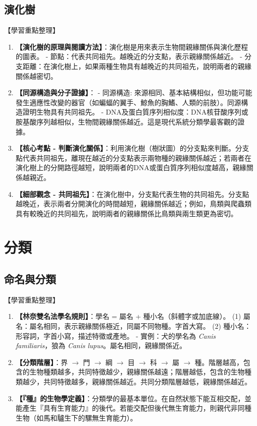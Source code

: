 \documentclass[11pt,a4paper]{article}
\begin{document}
\subsection{演化樹}
\begin{learningpoints}{【學習重點整理】}
\begin{enumerate}[label=\arabic*.]
  \item \textbf{【演化樹的原理與閱讀方法】}：演化樹是用來表示生物間親緣關係與演化歷程的圖表。
  - 節點：代表共同祖先。越晚近的分支點，表示親緣關係越近。
  - 分支距離：在演化樹上，如果兩種生物具有越晚近的共同祖先，說明兩者的親緣關係越密切。
  \item \textbf{【同源構造與分子證據】}：
  - 同源構造: 來源相同、基本結構相似，但功能可能發生適應性改變的器官（如蝙蝠的翼手、鯨魚的胸鰭、人類的前肢）。同源構造證明生物具有共同祖先。
  - DNA及蛋白質序列相似度：DNA核苷酸序列或胺基酸序列越相似，生物間親緣關係越近。這是現代系統分類學最客觀的證據。
  \item \textbf{【核心考點 - 判斷演化關係】}：利用演化樹（樹狀圖）的分支點來判斷。分支點代表共同祖先，離現在越近的分支點表示兩物種的親緣關係越近；若兩者在演化樹上的分開路徑越短，說明兩者的DNA或蛋白質序列相似度越高，親緣關係越親近。
  \item \textbf{【細部觀念 - 共同祖先】}：在演化樹中，分支點代表生物的共同祖先。分支點越晚近，表示兩者分開演化的時間越短，親緣關係越近；例如，鳥類與爬蟲類具有較晚近的共同祖先，說明兩者的親緣關係比鳥類與兩生類更為密切。
\end{enumerate}
\end{learningpoints}

\newpage
\section{分類}
\subsection{命名與分類}
\begin{learningpoints}{【學習重點整理】}
\begin{enumerate}[label=\arabic*.]
  \item \textbf{【林奈雙名法學名規則】}：學名 = 屬名 + 種小名（斜體字或加底線）。
  (1) 屬名：屬名相同，表示親緣關係極近，同屬不同物種。字首大寫。
  (2) 種小名：形容詞，字首小寫，描述特徵或產地。
  - 實例：犬的學名為 \textit{Canis familiaris}，狼為 \textit{Canis lupus}。屬名相同，親緣關係近。
  \item \textbf{【分類階層】}：界 $\rightarrow$ 門 $\rightarrow$ 綱 $\rightarrow$ 目 $\rightarrow$ 科 $\rightarrow$ 屬 $\rightarrow$ 種。階層越高，包含的生物種類越多，共同特徵越少，親緣關係越遠；階層越低，包含的生物種類越少，共同特徵越多，親緣關係越近。共同分類階層越低，親緣關係越近。
  \item \textbf{【『種』的生物學定義】}：分類學的最基本單位。在自然狀態下能互相交配，並能產生『具有生育能力』的後代。若能交配但後代無生育能力，則親代非同種生物（如馬和驢生下的騾無生育能力）。
\end{enumerate}
\end{learningpoints}
\end{document}
